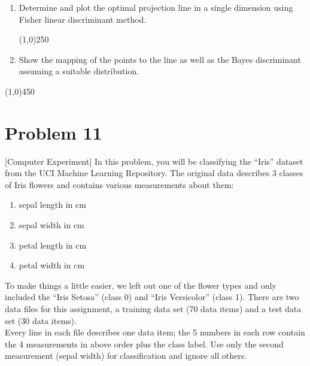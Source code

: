 \documentclass[12pt]{article}
\begin{document}
\begin{enumerate}
\item Determine and plot the optimal projection line in a single dimension using Fisher linear discriminant method. \\


\begin{center}
\line(1,0){250}
\end{center}

\item Show the mapping of the points to the line as well as the Bayes discriminant assuming a suitable distribution.\\



\end{enumerate}

\begin{center}
\line(1,0){450}
\end{center}


\section{Problem 11}
[Computer Experiment] In this problem, you will be classifying the “Iris” dataset from the UCI Machine Learning Repository. The original data describes 3 classes of Iris flowers and contains various measurements about them: 
\begin{enumerate}
\item sepal length in cm 
\item sepal width in cm
\item petal length in cm 
\item petal width in cm
\end{enumerate}
To make things a little easier, we left out one of the flower types and only included the “Iris Setosa” (class 0) and “Iris Versicolor” (class 1). There are two data files for this assignment, a training data set (70 data items) and a test data set (30 data items). \\

Every line in each file describes one data item; the 5 numbers in each row contain the 4 measurements in above order plus the class label. Use only the second measurement (sepal width) for classification and ignore all others.
\end{document}
